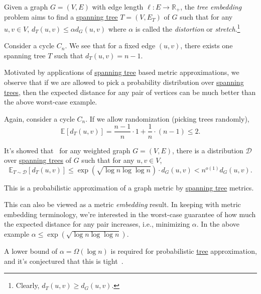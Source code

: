 \begin{problem}\label{prb:tree-embedding}
Given a graph \(G=(V, E)\) with edge length \(\ell \colon E \to \mathbb{R} _{+}\), the \emph{tree embedding} problem aims to find a \hyperref[def:spanning-tree]{spanning tree} \(T = (V, E_T)\) of \(G\) such that for any \(u, v \in V\), \(d_T(u, v) \leq \alpha d_G(u, v)\) where \(\alpha \) is called the \emph{distortion} or \emph{stretch}.\footnote{Clearly, \(d_T(u, v) \geq d_G(u, v)\).}
\end{problem}

\begin{eg}[Cycle]
	Consider a cycle \(C_n\). We see that for a fixed edge \((u, v)\), there exists one spanning tree \(T\) such that \(d_T(u, v) = n - 1\).
\end{eg}

Motivated by applications of \hyperref[def:spanning-tree]{spanning tree} based metric approximations, we observe that if we are allowed to pick a probability distribution over \hyperref[def:spanning-tree]{spanning trees}, then the expected distance for any pair of vertices can be much better than the above worst-case example.

\begin{eg}[Cycle]
	Again, consider a cycle \(C_n\). If we allow randomization (picking trees randomly),
	\[
		\mathbb{E}_{}[d_T(u, v)]
		= \frac{n-1}{n} \cdot 1 + \frac{1}{n} \cdot (n-1)
		\leq 2.
	\]
\end{eg}

It's showed that~\cite{alon1995graph} for any weighted graph \(G = (V, E)\), there is a distribution \(\mathcal{D} \) over \hyperref[def:spanning-tree]{spanning trees} of \(G\) such that for any \(u, v \in V\),
\[
	\mathbb{E}_{T \sim \mathcal{D} }[d_T(u, v)]
	\leq \exp (\sqrt{\log n \log \log n} ) \cdot d_G(u, v)
	< n^{o(1)} d_G(u, v).
\]

\begin{intuition}
	This is a probabilistic approximation of a graph metric by \hyperref[def:spanning-tree]{spanning tree} metrics.
\end{intuition}

This can also be viewed as a metric \emph{embedding} result. In keeping with metric embedding terminology, we're interested in the worst-case guarantee of how much the expected distance for any pair increases, i.e., minimizing \(\alpha \). In the above example \(\alpha \leq \exp (\sqrt{\log n \log \log n} )\).

\begin{note}
	A lower bound of \(\alpha = \Omega (\log n)\) is required for probabilistic \hyperref[def:spanning-tree]{tree} approximation, and it's conjectured that this is tight~\cite{alon1995graph}.
\end{note}

